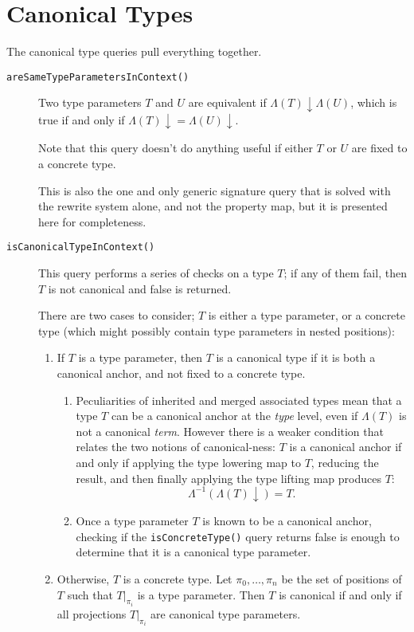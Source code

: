 \documentclass[a4paper,headsepline,bibliography=totoc,toc=flat,fleqn,twoside=semi]{scrbook}
\theoremstyle{definition}
\theoremstyle{definition}
\theoremstyle{definition}
\begin{document}
\section{Canonical Types}
The canonical type queries pull everything together.
\begin{description}
\item[\texttt{areSameTypeParametersInContext()}] Two type parameters $T$ and $U$ are equivalent if $\Lambda(T)\downarrow\Lambda(U)$, which is true if and only if $\Lambda(T){\downarrow}=\Lambda(U){\downarrow}$.

Note that this query doesn't do anything useful if either $T$ or $U$ are fixed to a concrete type.

This is also the one and only generic signature query
that is solved with the rewrite system alone, and not the property map, but it is presented here for completeness.
\item[\texttt{isCanonicalTypeInContext()}] This query performs a series of checks on a type $T$; if any of them fail, then $T$ is not canonical and false is returned.

There are two cases to consider; $T$ is either a type parameter, or a concrete type (which might possibly contain type parameters in nested positions):
\begin{enumerate}
\item If $T$ is a type parameter, then $T$ is a canonical type if it is both a canonical anchor, and not fixed to a concrete type.
\begin{enumerate}
\item
Peculiarities of inherited and merged associated types mean that a type $T$ can be a canonical anchor at the \emph{type} level, even if $\Lambda(T)$ is not a canonical \emph{term}. However there is a weaker condition that relates the two notions of canonical-ness: $T$ is a canonical anchor if and only if applying the type lowering map to $T$, reducing the result, and then finally applying the type lifting map produces $T$:
\[\Lambda^{-1}(\Lambda(T){\downarrow})=T.\]
\item
Once a type parameter $T$ is known to be a canonical anchor, checking if the \texttt{isConcreteType()} query returns false is enough to determine that it is a canonical type parameter.
\end{enumerate}
\item Otherwise, $T$ is a concrete type. Let $\pi_0,\ldots,\pi_n$ be the set of positions of $T$ such
that $T|_{\pi_i}$ is a type parameter. Then $T$ is canonical if and only if all
projections $T|_{\pi_i}$ are canonical type parameters.
\end{enumerate}


\end{description}
\end{document}

